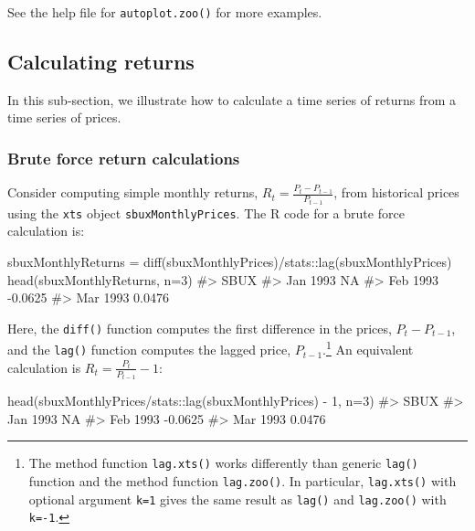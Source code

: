 \documentclass[
  letterpaper,
  DIV=11,
  numbers=noendperiod]{scrreprt}
\newenvironment{Shaded}{\begin{snugshade}}{\end{snugshade}}
\newcommand{\AttributeTok}[1]{\textcolor[rgb]{0.40,0.45,0.13}{#1}}
\newcommand{\CommentTok}[1]{\textcolor[rgb]{0.37,0.37,0.37}{#1}}
\newcommand{\DecValTok}[1]{\textcolor[rgb]{0.68,0.00,0.00}{#1}}
\newcommand{\FunctionTok}[1]{\textcolor[rgb]{0.28,0.35,0.67}{#1}}
\newcommand{\NormalTok}[1]{\textcolor[rgb]{0.00,0.23,0.31}{#1}}
\newcommand{\OtherTok}[1]{\textcolor[rgb]{0.00,0.23,0.31}{#1}}
\newcommand{\SpecialCharTok}[1]{\textcolor[rgb]{0.37,0.37,0.37}{#1}}
\theoremstyle{definition}
\theoremstyle{definition}
\theoremstyle{remark}
\begin{document}
See the help file for \texttt{autoplot.zoo()} for more examples.

\hypertarget{calculating-returns}{%
\subsection{Calculating returns}\label{calculating-returns}}

In this sub-section, we illustrate how to calculate a time series of
returns from a time series of prices.

\hypertarget{brute-force-return-calculations}{%
\subsubsection{Brute force return
calculations}\label{brute-force-return-calculations}}

Consider computing simple monthly returns,
\(R_{t}=\frac{P_{t}-P_{t-1}}{P_{t-1}}\), from historical prices using
the \texttt{xts} object \texttt{sbuxMonthlyPrices}. The R code for a
brute force calculation is:

\begin{Shaded}
\begin{Highlighting}[]
\NormalTok{sbuxMonthlyReturns }\OtherTok{=} \FunctionTok{diff}\NormalTok{(sbuxMonthlyPrices)}\SpecialCharTok{/}\NormalTok{stats}\SpecialCharTok{::}\FunctionTok{lag}\NormalTok{(sbuxMonthlyPrices)}
\FunctionTok{head}\NormalTok{(sbuxMonthlyReturns, }\AttributeTok{n=}\DecValTok{3}\NormalTok{)}
\CommentTok{\#\textgreater{}             SBUX}
\CommentTok{\#\textgreater{} Jan 1993      NA}
\CommentTok{\#\textgreater{} Feb 1993 {-}0.0625}
\CommentTok{\#\textgreater{} Mar 1993  0.0476}
\end{Highlighting}
\end{Shaded}

Here, the \texttt{diff()} function computes the first difference in the
prices, \(P_{t}-P_{t-1}\), and the \texttt{lag()} function computes the
lagged price, \(P_{t-1}.\)\footnote{The method function
  \texttt{lag.xts()} works differently than generic \texttt{lag()}
  function and the method function \texttt{lag.zoo()}. In particular,
  \texttt{lag.xts()} with optional argument \texttt{k=1} gives the same
  result as \texttt{lag()} and \texttt{lag.zoo()} with \texttt{k=-1}.}
An equivalent calculation is \(R_{t}=\frac{P_{t}}{P_{t-1}}-1\):

\begin{Shaded}
\begin{Highlighting}[]
\FunctionTok{head}\NormalTok{(sbuxMonthlyPrices}\SpecialCharTok{/}\NormalTok{stats}\SpecialCharTok{::}\FunctionTok{lag}\NormalTok{(sbuxMonthlyPrices) }\SpecialCharTok{{-}} \DecValTok{1}\NormalTok{, }\AttributeTok{n=}\DecValTok{3}\NormalTok{)}
\CommentTok{\#\textgreater{}             SBUX}
\CommentTok{\#\textgreater{} Jan 1993      NA}
\CommentTok{\#\textgreater{} Feb 1993 {-}0.0625}
\CommentTok{\#\textgreater{} Mar 1993  0.0476}
\end{Highlighting}
\end{Shaded}
\end{document}
